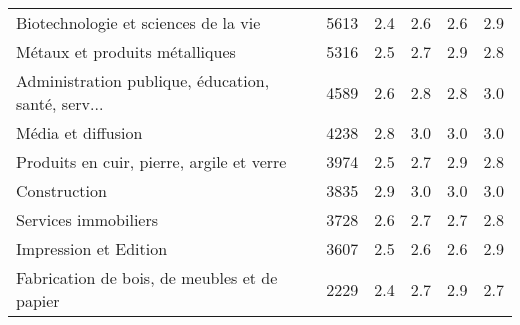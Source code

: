 \begin{tabular}{lrrrrr}
Biotechnologie et sciences de la vie               &          5613 &         2.4 &      2.6 &    2.6 &     2.9 \\
Métaux et produits métalliques                     &          5316 &         2.5 &      2.7 &    2.9 &     2.8 \\
Administration publique, éducation, santé, serv... &          4589 &         2.6 &      2.8 &    2.8 &     3.0 \\
Média et diffusion                                 &          4238 &         2.8 &      3.0 &    3.0 &     3.0 \\
Produits en cuir, pierre, argile et verre          &          3974 &         2.5 &      2.7 &    2.9 &     2.8 \\
Construction                                       &          3835 &         2.9 &      3.0 &    3.0 &     3.0 \\
Services immobiliers                               &          3728 &         2.6 &      2.7 &    2.7 &     2.8 \\
Impression et Edition                              &          3607 &         2.5 &      2.6 &    2.6 &     2.9 \\
Fabrication de bois, de meubles et de papier       &          2229 &         2.4 &      2.7 &    2.9 &     2.7 \\
\bottomrule
\end{tabular}

